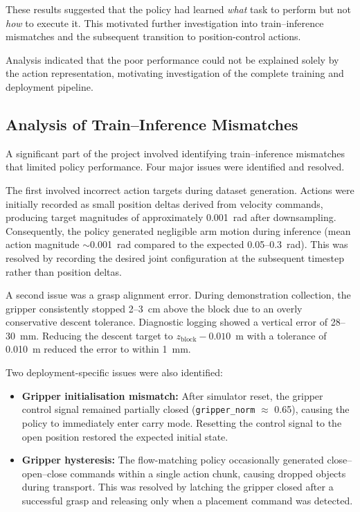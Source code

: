 \documentclass[conference, 12pt]{IEEEtran}
\begin{document}
These results suggested that the policy had learned \emph{what} task to perform but not \emph{how} to execute it. This motivated further investigation into train--inference mismatches and the subsequent transition to position-control actions.

Analysis indicated that the poor performance could not be explained solely by the action representation, motivating investigation of the complete training and deployment pipeline.


\subsection{Analysis of Train--Inference Mismatches}
\label{sec:latch_fix}
A significant part of the project involved identifying train--inference mismatches that limited policy performance. Four major issues were identified and resolved.

The first involved incorrect action targets during dataset generation. Actions were initially recorded as small position deltas derived from velocity commands, producing target magnitudes of approximately 0.001~rad after downsampling. Consequently, the policy generated negligible arm motion during inference (mean action magnitude $\sim$0.001~rad compared to the expected 0.05--0.3~rad). This was resolved by recording the desired joint configuration at the subsequent timestep rather than position deltas.

A second issue was a grasp alignment error. During demonstration collection, the gripper consistently stopped 2--3~cm above the block due to an overly conservative descent tolerance. Diagnostic logging showed a vertical error of 28--30~mm. Reducing the descent target to $z_\text{block}-0.010$~m with a tolerance of 0.010~m reduced the error to within 1~mm.

Two deployment-specific issues were also identified:

\begin{itemize}
\item \textbf{Gripper initialisation mismatch:} After simulator reset, the gripper control signal remained partially closed (\texttt{gripper\_norm} $\approx$ 0.65), causing the policy to immediately enter carry mode. Resetting the control signal to the open position restored the expected initial state.

\item \textbf{Gripper hysteresis:} The flow-matching policy occasionally generated close--open--close commands within a single action chunk, causing dropped objects during transport. This was resolved by latching the gripper closed after a successful grasp and releasing only when a placement command was detected.
\end{itemize}
\end{document}
